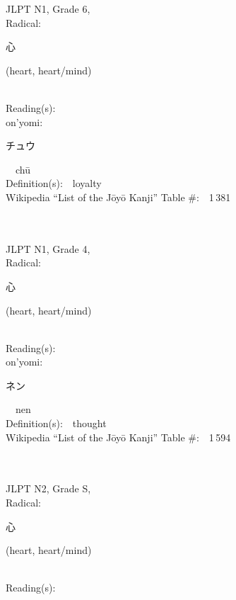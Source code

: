 \begin{multicols}{2}
{JLPT N1, Grade 6, \\Radical:\ \ {\begin{CJK}{UTF8}{min} 心 \end{CJK}} (heart, heart/mind) } \\
Reading(s):\ \ \\
{\hspace*{1em}}on'yomi:\ \ \\
{\hspace*{2em}}{\begin{CJK}{UTF8}{min} チュウ \end{CJK}}\ \ ch\=u\ \ \\
Definition(s):\ \ loyalty \\
Wikipedia ``List of the J\=oy\=o Kanji'' Table \#:\ \ 1\,381 \\
\ \ \\
{\fontsize{34pt}{40pt}  }\ \ \\  %
{JLPT N1, Grade 4, \\Radical:\ \ {\begin{CJK}{UTF8}{min} 心 \end{CJK}} (heart, heart/mind) } \\
Reading(s):\ \ \\
{\hspace*{1em}}on'yomi:\ \ \\
{\hspace*{2em}}{\begin{CJK}{UTF8}{min} ネン \end{CJK}}\ \ nen\ \ \\
Definition(s):\ \ thought \\
Wikipedia ``List of the J\=oy\=o Kanji'' Table \#:\ \ 1\,594 \\
\ \ \\
{\fontsize{34pt}{40pt}  }\ \ \\  %
{JLPT N2, Grade S, \\Radical:\ \ {\begin{CJK}{UTF8}{min} 心 \end{CJK}} (heart, heart/mind) } \\
Reading(s):\ \ \\

\end{multicols}
